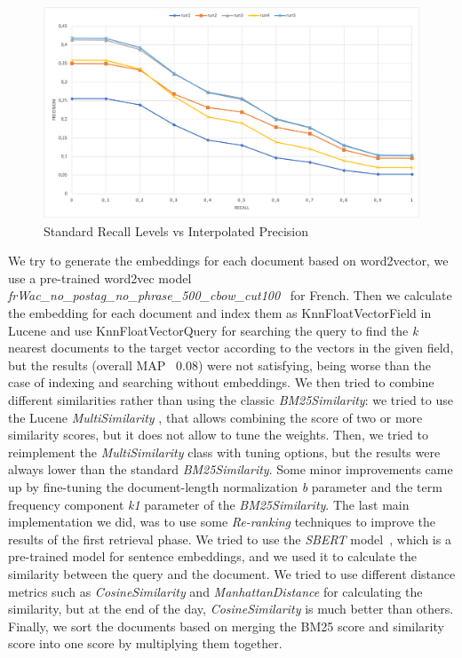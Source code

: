 \newpage
\enlargethispage{4\baselineskip}
\begin{figure}[h!]
    \includegraphics[width=\textwidth]{figure/PRgraph.png}
    \caption{Standard Recall Levels vs Interpolated Precision}
    \label{fig:recallPrecision}
\end{figure}

We try to generate the embeddings for each document based on word2vector, we use a pre-trained word2vec model \textit{frWac\_no\_postag\_no\_phrase\_500\_cbow\_cut100}~\cite{fauconnier_2015} for French. Then we calculate the embedding for each document and index them as KnnFloatVectorField in Lucene and use KnnFloatVectorQuery \cite{lucene-knnvectorfield} for searching the query to find the \textit{k} nearest documents to the target vector according to the vectors in the given field, but the results (overall \ac{MAP} ~0.08) were not satisfying, being worse than the case of indexing and searching without embeddings.
\newline
We then tried to combine different similarities rather than using the classic \textit{BM25Similarity}: we tried to use the Lucene \textit{MultiSimilarity} \cite{lucenemultisimilarity}, that allows combining the score of two or more similarity scores, but it does not allow to
tune the weights. Then, we tried to reimplement the \textit{MultiSimilarity} class with tuning options, but the results were always lower than the standard \textit{BM25Similarity}. Some minor improvements came up by fine-tuning the document-length
normalization \textit{b} parameter and the term frequency component \textit{k1} parameter of the \textit{BM25Similarity}.
\newline
The last main implementation we did, was to use some \textit{Re-ranking} techniques to improve the results of the first retrieval phase.
We tried to use the \textit{SBERT} model~\cite{reimers-2019-sentence-bert}, which is a pre-trained model for sentence embeddings, and we used it to calculate the similarity between the query and the document.
We tried to use different distance metrics such as \textit{CosineSimilarity} \cite{pytorch-cosinesimilarity} and \textit{ManhattanDistance} \cite{dads-manhattandistance} for calculating the similarity, but at the end of the day, \textit{CosineSimilarity} is much better than others.
Finally, we sort the documents based on merging the BM25 score and similarity score into one score by multiplying them together.

